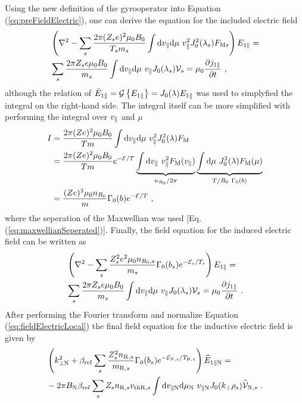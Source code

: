 Using the new definition of the gyrooperator into Equation (\ref{eq:preFieldElectric}), one can derive the equation for the included electric field 
\begin{gather}
    \begin{aligned}
        &\left(\nabla^2 - \sum_s \frac{2\pi (Z_se)^2 \mu_0 B_0}{T_sm_s}  \int \mathrm{d}v_\parallel\mathrm{d}\mu ~ v_\parallel^2 J_0^2(\lambda_s) F_{\mathrm{M}s} \right) E_{1\parallel} = \\
	    &\sum_s \frac{2\pi Z_se \mu_0 B_0}{m_s}  \int \mathrm{d}v_\parallel\mathrm{d}\mu ~ v_\parallel J_0(\lambda_s) \mathcal{V}_s = \mu_0 \frac{\partial j_{1\parallel}}{\partial t}~,
    \end{aligned}
	\label{eq:prefieldElectricLocal}
\end{gather}
although the relation of $\bar{E}_{1\parallel} = \mathcal{G} \left\{E_{1\parallel}\right\} = J_0(\lambda) E_{1\parallel}$ was used to simplyfied the integral on the right-hand side. The integral itself can be more simplified with performing the integral over $v_\parallel$ and $\mu$
\begin{gather}
	\begin{aligned}
		I &= \frac{2\pi (Ze)^2 \mu_0 B_0}{Tm}  \int \mathrm{d}v_\parallel\mathrm{d}\mu ~ v_\parallel^2 J_0^2(\lambda) F_\mathrm{M} \\
		  &= \frac{2\pi (Ze)^2 \mu_0 B_0}{Tm} e^{-\mathcal{E}/T} \underbrace{\int \mathrm{d}v_\parallel ~ v_\parallel^2 F_\mathrm{M}(v_\parallel)}_{n_{R_0}/2\pi} \underbrace{\int \mathrm{d}\mu ~ J_0^2(\lambda) F_\mathrm{M}(\mu)}_{T/B_0~\Gamma_0(b)} \\
		  &= \frac{(Ze)^2 \mu_0 n_{R_0}}{m} \Gamma_0(b) e^{-\mathcal{E}/T} ~,
	\end{aligned}
\end{gather}
where the seperation of the Maxwellian was used [Eq. (\ref{eq:maxwellianSeperated})]. Finally, the field equation for the induced electric field can be written as
\begin{gather}
    \begin{aligned}
        &\left(\nabla^2 - \sum_s \frac{Z_s^2e^2 \mu_0 n_{R_0,s}}{m_s} \Gamma_0(b_s) e^{-\mathcal{E}_s/T_s} \right) E_{1\parallel} = \\
	    &\sum_s \frac{2\pi Z_se \mu_0 B_0}{m_s}  \int \mathrm{d}v_\parallel\mathrm{d}\mu ~ v_\parallel J_0(\lambda_s) \mathcal{V}_s = \mu_0 \frac{\partial j_{1\parallel}}{\partial t}~.
    \end{aligned}
	\label{eq:fieldElectricLocal}
\end{gather}
After performing the Fourier transform and normalize Equation (\ref{eq:fieldElectricLocal}) the final field equation for the inductive electric field is given by
\begin{gather}
    \begin{aligned}
        &\left(k_{\perp \mathrm{N}}^2 + \beta_\mathrm{ref} \sum_s \frac{Z^2_sn_{\mathrm{R},s}}{m_{\mathrm{R},s}} \Gamma_0(b_s) e^{-\mathcal{E}_{\mathrm{N},s}/T_{\mathrm{R},s}} \right) \widehat{E}_{1\parallel \mathrm{N}} = \\
        &- 2\pi B_\mathrm{N} \beta_\mathrm{ref} \sum_s Z_s n_{\mathrm{R},s} v_{\mathrm{th}\mathrm{R},s} \int \mathrm{d}v_{\parallel \mathrm{N}} \mathrm{d}\mu_\mathrm{N} ~ v_{\parallel \mathrm{N}} J_0(k_\perp \rho_s) \widehat{\mathcal{V}}_{\mathrm{N},s} ~.
    \end{aligned}
    \label{eq:fieldElectricLocalNorm}
\end{gather}